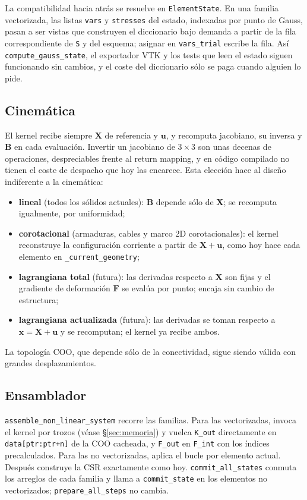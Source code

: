 \documentclass[11pt,letterpaper,oneside]{article}
\newcommand{\code}[1]{\texttt{#1}}
\begin{document}
La compatibilidad hacia atrás se resuelve en \code{ElementState}. En una familia vectorizada, las listas \code{vars} y \code{stresses} del estado, indexadas por punto de Gauss, pasan a ser vistas que construyen el diccionario bajo demanda a partir de la fila correspondiente de \code{S} y del esquema; asignar en \code{vars\_trial} escribe la fila. Así \code{compute\_gauss\_state}, el exportador VTK y los tests que leen el estado siguen funcionando sin cambios, y el coste del diccionario sólo se paga cuando alguien lo pide.

\subsection{Cinemática}

El kernel recibe siempre $\mathbf X$ de referencia y $\mathbf u$, y recomputa jacobiano, su inversa y $\mathbf B$ en cada evaluación. Invertir un jacobiano de $3\times3$ son unas decenas de operaciones, despreciables frente al return mapping, y en código compilado no tienen el coste de despacho que hoy las encarece. Esta elección hace al diseño indiferente a la cinemática:
\begin{itemize}[nosep]
  \item \textbf{lineal} (todos los sólidos actuales): $\mathbf B$ depende sólo de $\mathbf X$; se recomputa igualmente, por uniformidad;
  \item \textbf{corotacional} (armaduras, cables y marco 2D corotacionales): el kernel reconstruye la configuración corriente a partir de $\mathbf X + \mathbf u$, como hoy hace cada elemento en \code{\_current\_geometry};
  \item \textbf{lagrangiana total} (futura): las derivadas respecto a $\mathbf X$ son fijas y el gradiente de deformación $\mathbf F$ se evalúa por punto; encaja sin cambio de estructura;
  \item \textbf{lagrangiana actualizada} (futura): las derivadas se toman respecto a $\mathbf x = \mathbf X + \mathbf u$ y se recomputan; el kernel ya recibe ambos.
\end{itemize}
La topología COO, que depende sólo de la conectividad, sigue siendo válida con grandes desplazamientos.

\subsection{Ensamblador}

\code{assemble\_non\_linear\_system} recorre las familias. Para las vectorizadas, invoca el kernel por trozos (véase §\ref{sec:memoria}) y vuelca \code{K\_out} directamente en \code{data[ptr:ptr+n]} de la COO cacheada, y \code{F\_out} en \code{F\_int} con los índices precalculados. Para las no vectorizadas, aplica el bucle por elemento actual. Después construye la CSR exactamente como hoy. \code{commit\_all\_states} conmuta los arreglos de cada familia y llama a \code{commit\_state} en los elementos no vectorizados; \code{prepare\_all\_steps} no cambia.
\end{document}
